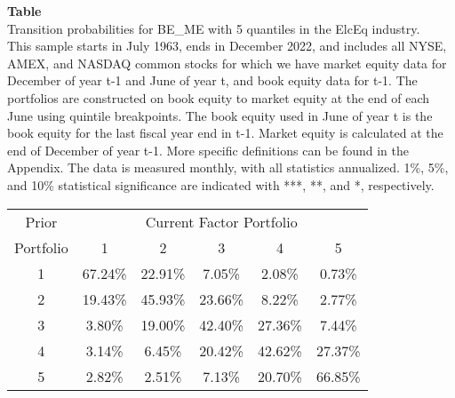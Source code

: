 \begin{table*}[ht!]
\raggedright
{}
\label{tab: transition_probs_BE_ME_ElcEq_with_5_quantiles}
\textbf{Table \thetable} \\
Transition probabilities for BE_ME with 5 quantiles in the ElcEq industry. \\
\hspace*{1em}This sample starts in July 1963, ends in December 2022, and includes all NYSE, AMEX, and NASDAQ common stocks for which we have market equity data for December of year t-1 and June of year t, and book equity data for t-1. The portfolios are constructed on book equity to market equity at the end of each June using quintile breakpoints.  The book equity used in June of year t is the book equity for the last fiscal year end in t-1.  Market equity is calculated at the end of December of year t-1.  More specific definitions can be found in the Appendix.  The data is measured monthly, with all statistics annualized.  1\%, 5\%, and 10\% statistical significance are indicated with ***, **, and *, respectively. \\
\vspace{0.5em}
\centering
\begin{adjustbox}{max width=\textwidth}
\begin{tabular}{@{}cccccc@{}}
\toprule
Prior & \multicolumn{5}{c}{Current Factor Portfolio} \\
Portfolio & 1 & 2 & 3 & 4 & 5 \\
\midrule
1 & 67.24\% & 22.91\% & 7.05\% & 2.08\% & 0.73\% \\
2 & 19.43\% & 45.93\% & 23.66\% & 8.22\% & 2.77\% \\
3 & 3.80\% & 19.00\% & 42.40\% & 27.36\% & 7.44\% \\
4 & 3.14\% & 6.45\% & 20.42\% & 42.62\% & 27.37\% \\
5 & 2.82\% & 2.51\% & 7.13\% & 20.70\% & 66.85\% \\
\bottomrule
\end{tabular}
\end{adjustbox}
\end{table*}